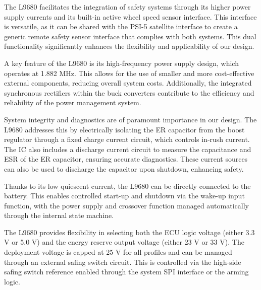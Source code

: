 \documentclass[12pt	]{article}
\begin{document}
The L9680 facilitates the integration of safety systems through its higher power supply currents and its built-in active wheel speed sensor interface. This interface is versatile, as it can be shared with the PSI-5 satellite interface to create a generic remote safety sensor interface that complies with both systems. This dual functionality significantly enhances the flexibility and applicability of our design.

A key feature of the L9680 is its high-frequency power supply design, which operates at 1.882 MHz. This allows for the use of smaller and more cost-effective external components, reducing overall system costs. Additionally, the integrated synchronous rectifiers within the buck converters contribute to the efficiency and reliability of the power management system.

System integrity and diagnostics are of paramount importance in our design. The L9680 addresses this by electrically isolating the ER capacitor from the boost regulator through a fixed charge current circuit, which controls in-rush current. The IC also includes a discharge current circuit to measure the capacitance and ESR of the ER capacitor, ensuring accurate diagnostics. These current sources can also be used to discharge the capacitor upon shutdown, enhancing safety.

Thanks to its low quiescent current, the L9680 can be directly connected to the battery. This enables controlled start-up and shutdown via the wake-up input function, with the power supply and crossover function managed automatically through the internal state machine.

The L9680 provides flexibility in selecting both the ECU logic voltage (either 3.3 V or 5.0 V) and the energy reserve output voltage (either 23 V or 33 V). The deployment voltage is capped at 25 V for all profiles and can be managed through an external safing switch circuit. This is controlled via the high-side safing switch reference enabled through the system SPI interface or the arming logic.
\end{document}
